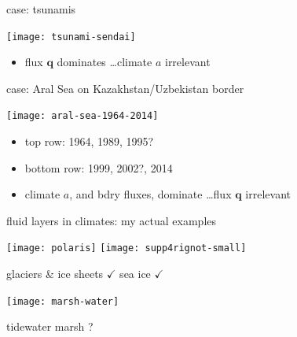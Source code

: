 \documentclass[xcolor={dvipsnames}]{beamer}
\newcommand\bq{\mathbf{q}}
\begin{document}
\begin{frame}{case: tsunamis}

\begin{center}
\texttt{[image: tsunami-sendai]}
\end{center}

\begin{itemize}
\item flux $\bq$ dominates \dots climate $a$ irrelevant
\end{itemize}
\end{frame}


\begin{frame}{case: Aral Sea on  Kazakhstan/Uzbekistan border}

\begin{center}
\texttt{[image: aral-sea-1964-2014]}
\end{center}

\begin{itemize}
\item top row: 1964, 1989, 1995?
\item bottom row: 1999, 2002?, 2014
\item climate $a$, and bdry fluxes, dominate \dots flux $\bq$ irrelevant
\end{itemize}
\end{frame}


\begin{frame}{fluid layers in climates: my actual examples}

\texttt{[image: polaris]}
\hfill
\texttt{[image: supp4rignot-small]}

\small glaciers \& ice sheets $\checkmark$ \hfill sea ice $\checkmark$

\medskip
\begin{center}
\texttt{[image: marsh-water]}

\small tidewater marsh ?
\end{center}
\end{frame}
\end{document}
